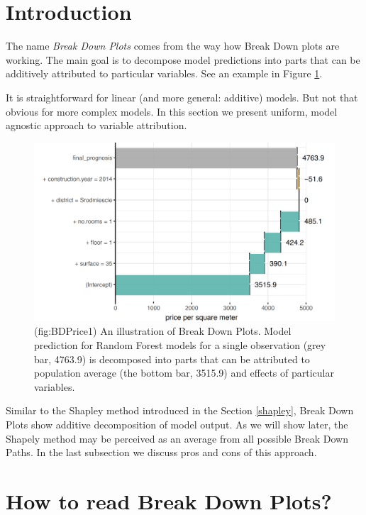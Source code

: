 \documentclass[]{book}
\theoremstyle{definition}
\theoremstyle{definition}
\theoremstyle{definition}
\theoremstyle{remark}
\begin{document}
\hypertarget{introduction-1}{%
\section{Introduction}\label{introduction-1}}

The name \emph{Break Down Plots} comes from the way how Break Down plots
are working. The main goal is to decompose model predictions into parts
that can be additively attributed to particular variables. See an
example in Figure \ref{fig:BDPrice1}.

It is straightforward for linear (and more general: additive) models.
But not that obvious for more complex models. In this section we present
uniform, model agnostic approach to variable attribution.

\begin{figure}

{\centering \includegraphics[width=0.7\linewidth]{figure/bd_price_1} 

}

\caption{(fig:BDPrice1) An illustration of Break Down Plots. Model prediction for Random Forest models for a single observation (grey bar, 4763.9) is decomposed into parts that can be attributed to population average (the bottom bar, 3515.9) and effects of particular variables. }\label{fig:BDPrice1}
\end{figure}

Similar to the Shapley method introduced in the Section \ref{shapley},
Break Down Plots show additive decomposition of model output. As we will
show later, the Shapely method may be perceived as an average from all
possible Break Down Paths. In the last subsection we discuss pros and
cons of this approach.

\hypertarget{how-to-read-break-down-plots}{%
\section{How to read Break Down
Plots?}\label{how-to-read-break-down-plots}}
\end{document}
